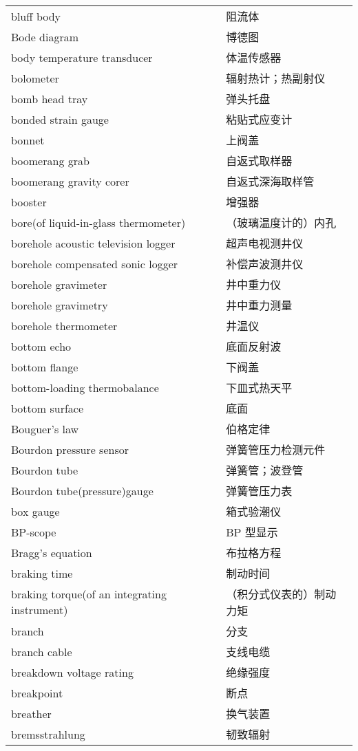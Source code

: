 \documentclass[
]{article}
\begin{document}
\begin{longtable}[]{@{}ll@{}}
bluff body & 阻流体 \\
Bode diagram & 博德图 \\
body temperature transducer & 体温传感器 \\
bolometer & 辐射热计；热副射仪 \\
bomb head tray & 弹头托盘 \\
bonded strain gauge & 粘贴式应变计 \\
bonnet & 上阀盖 \\
boomerang grab & 自返式取样器 \\
boomerang gravity corer & 自返式深海取样管 \\
booster & 增强器 \\
bore(of liquid-in-glass thermometer) & （玻璃温度计的）内孔 \\
borehole acoustic television logger & 超声电视测井仪 \\
borehole compensated sonic logger & 补偿声波测井仪 \\
borehole gravimeter & 井中重力仪 \\
borehole gravimetry & 井中重力测量 \\
borehole thermometer & 井温仪 \\
bottom echo & 底面反射波 \\
bottom flange & 下阀盖 \\
bottom-loading thermobalance & 下皿式热天平 \\
bottom surface & 底面 \\
Bouguer's law & 伯格定律 \\
Bourdon pressure sensor & 弹簧管压力检测元件 \\
Bourdon tube & 弹簧管；波登管 \\
Bourdon tube(pressure)gauge & 弹簧管压力表 \\
box gauge & 箱式验潮仪 \\
BP-scope & BP 型显示 \\
Bragg's equation & 布拉格方程 \\
braking time & 制动时间 \\
braking torque(of an integrating instrument) &
（积分式仪表的）制动力矩 \\
branch & 分支 \\
branch cable & 支线电缆 \\
breakdown voltage rating & 绝缘强度 \\
breakpoint & 断点 \\
breather & 换气装置 \\
bremsstrahlung & 韧致辐射 \\

\end{longtable}
\end{document}
